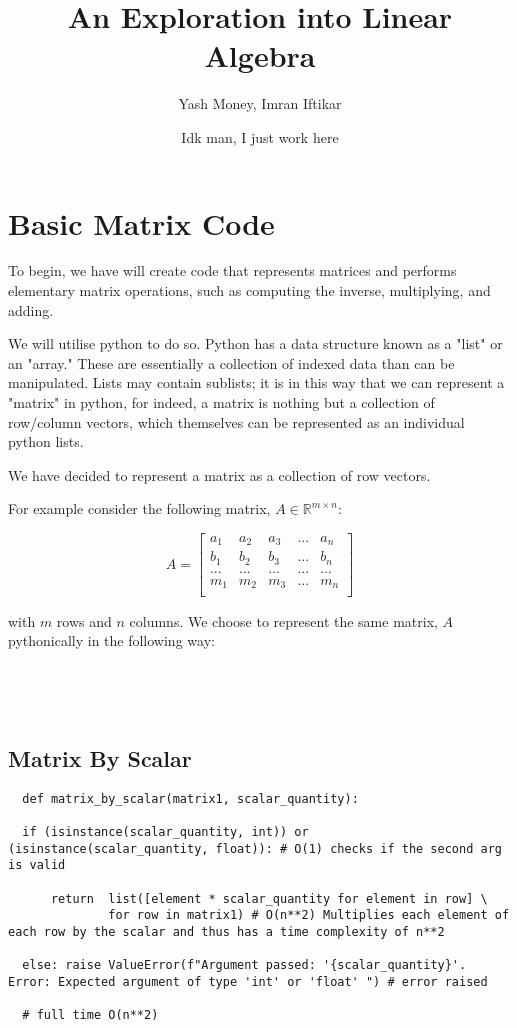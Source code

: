 \documentclass[12pt, a4paper]{article}
\title{An Exploration into Linear Algebra}
\author{Yash Money, Imran Iftikar}
\date{Idk man, I just work here}
\begin{document}
\maketitle

\section{Basic Matrix Code}

To begin, we have will create code that represents matrices and
performs elementary matrix operations, such as computing the inverse, 
multiplying, and adding. 

We will utilise python to do so. Python has a data structure known as a "list" or an "array."
These are essentially a collection of indexed data than can be manipulated. Lists may contain sublists; it is in this way
that we can represent a "matrix" in python, for indeed, a matrix is nothing but a collection of row/column vectors, which themselves
can be represented as an individual python lists. 

We have decided to represent a matrix as a collection of row vectors.

For example consider the following matrix, $ A \in \mathbb{R}^{m\times n} $: 

\begin{equation*}
    A =
\begin{bmatrix}
a_{1}  & a_{2} & a_{3} & ... & a_{n}\\
b_{1}  & b_{2} & b_{3} & ... & b_{n}\\
...  & ...& ... & ... & ...\\
m_{1}  & m_{2} & m_{3} & ... & m_{n}\\
\end{bmatrix}
\end{equation*}

with $m$ rows and $n$ columns. We choose to represent the same matrix, $A$ pythonically in the following way:

\begin{lstlisting}


    
\end{lstlisting}

\subsection{Matrix By Scalar}

\begin{lstlisting}
  def matrix_by_scalar(matrix1, scalar_quantity):

  if (isinstance(scalar_quantity, int)) or (isinstance(scalar_quantity, float)): # O(1) checks if the second arg is valid

      return  list([element * scalar_quantity for element in row] \
              for row in matrix1) # O(n**2) Multiplies each element of each row by the scalar and thus has a time complexity of n**2
  
  else: raise ValueError(f"Argument passed: '{scalar_quantity}'. Error: Expected argument of type 'int' or 'float' ") # error raised

  # full time O(n**2)
\end{lstlisting}
\end{document}
